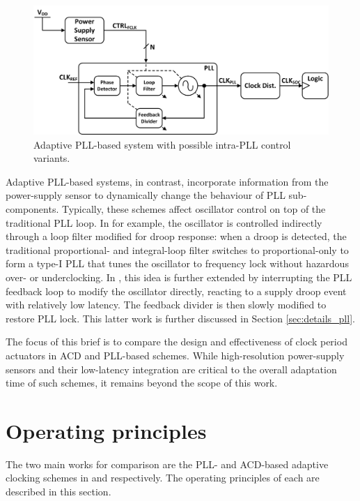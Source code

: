 \documentclass[twoside,9pt,journal,letterpage]{IEEEtran}
\begin{document}
\begin{figure}[h]
	\centering
	\includegraphics[width=\columnwidth]{fig_overview_pll}
	\caption{Adaptive PLL-based system with possible intra-PLL control variants.}
	\label{fig:overview_pll}
\end{figure}

Adaptive PLL-based systems, in contrast, incorporate information from the power-supply sensor to dynamically change the behaviour of PLL sub-components. Typically, these schemes affect oscillator control on top of the traditional PLL loop. In \cite{ahmad2017} for example, the oscillator is controlled indirectly through a loop filter modified for droop response: when a droop is detected, the traditional proportional- and integral-loop filter switches to proportional-only to form a type-I PLL that tunes the oscillator to frequency lock without hazardous over- or underclocking. In \cite{hashimoto2018}, this idea is further extended by interrupting the PLL feedback loop to modify the oscillator directly, reacting to a supply droop event with relatively low latency. The feedback divider is then slowly modified to restore PLL lock. This latter work is further discussed in Section \ref{sec:details_pll}.

The focus of this brief is to compare the design and effectiveness of clock period actuators in ACD and PLL-based schemes. While high-resolution power-supply sensors and their low-latency integration are critical to the overall adaptation time of such schemes, it remains beyond the scope of this work.

\section{Operating principles}
\label{sec:details}
The two main works for comparison are the PLL- and ACD-based adaptive clocking schemes in \cite{hashimoto2018} and \cite{wilcox2015} respectively. The operating principles of each are described in this section.
\end{document}

